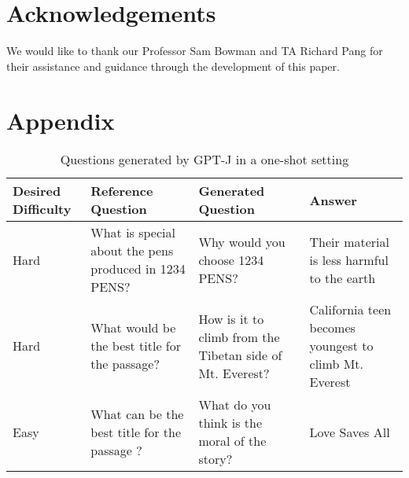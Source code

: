 \documentclass[11pt]{article}
\begin{document}
\section*{Acknowledgements}

We would like to thank our Professor Sam Bowman and TA Richard Pang for their assistance and guidance through the development of this paper.

\newpage



\clearpage

\appendix
\section{Appendix}

\begin{table}[!hbt]
\centering
\begin{tabular}{|p{3cm}|p{4cm}|p{4cm}|p{3.5cm}|}
\hline
\textbf{Desired Difficulty} & \textbf{Reference Question} & \textbf{Generated Question} & \textbf{Answer}\\
\hline
Hard & 
What is special about the pens produced in 1234 PENS? & 
Why would you choose 1234 PENS? &  
Their material is less harmful to the earth\\
\hline
Hard & 
What would be the best title for the passage?  & 
How is it to climb from the Tibetan side of Mt. Everest? & 
California teen becomes youngest to climb Mt. Everest\\
\hline
Easy & 
What can be the best title for the passage ? & 
What do you think is the moral of the story? & 
Love Saves All\\
\hline
\end{tabular}
\caption{\label{citation-guide}
Questions generated by GPT-J in a one-shot setting}
\end{table}

\clearpage
\end{document}
